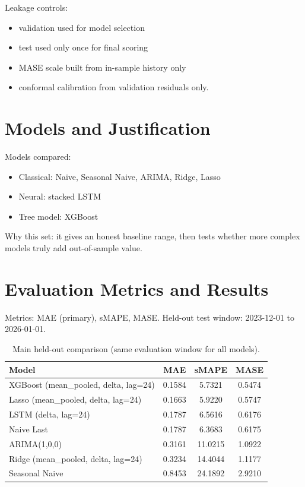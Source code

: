 ﻿\documentclass[11pt]{article}
\begin{document}
Leakage controls:
\begin{itemize}
  \item validation used for model selection
  \item test used only once for final scoring
  \item MASE scale built from in-sample history only
  \item conformal calibration from validation residuals only.
\end{itemize}

\section{Models and Justification}
Models compared:
\begin{itemize}
  \item Classical: Naive, Seasonal Naive, ARIMA, Ridge, Lasso
  \item Neural: stacked LSTM
  \item Tree model: XGBoost
\end{itemize}

Why this set: it gives an honest baseline range, then tests whether more complex models truly add out-of-sample value.

\section{Evaluation Metrics and Results}
Metrics: MAE (primary), sMAPE, MASE.
Held-out test window: 2023-12-01 to 2026-01-01.

\begin{table}[H]
\centering
\begin{tabular}{lccc}
\toprule
Model & MAE & sMAPE & MASE \\
\midrule
XGBoost (mean\_pooled, delta, lag=24) & 0.1584 & 5.7321 & 0.5474 \\
Lasso (mean\_pooled, delta, lag=24) & 0.1663 & 5.9220 & 0.5747 \\
LSTM (delta, lag=24) & 0.1787 & 6.5616 & 0.6176 \\
Naive Last & 0.1787 & 6.3683 & 0.6175 \\
ARIMA(1,0,0) & 0.3161 & 11.0215 & 1.0922 \\
Ridge (mean\_pooled, delta, lag=24) & 0.3234 & 14.4044 & 1.1177 \\
Seasonal Naive & 0.8453 & 24.1892 & 2.9210 \\
\bottomrule
\end{tabular}
\caption{Main held-out comparison (same evaluation window for all models).}
\end{table}
\end{document}
